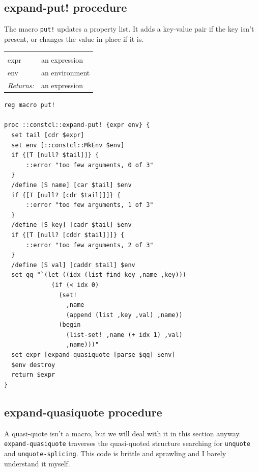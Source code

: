 \documentclass[twoside,9pt]{report}
\begin{document}
\subsection{expand-put! procedure}
\label{expand-put"!-procedure}


The macro \texttt{put!} updates a property list. It adds a key-value pair if the key isn't present, or changes the value in place if it is.

\noindent\begin{tabular}{ |p{1.9cm} p{8cm}| }
\hline
\rowcolor[HTML]{CCCCCC} \multicolumn{2}{|l|}{\bf expand-put! (internal)} \\
expr & an expression \\
env & an environment \\
\textit{Returns:} & an expression \\
\hline
\end{tabular}
\begin{lstlisting}
reg macro put!

proc ::constcl::expand-put! {expr env} {
  set tail [cdr $expr]
  set env [::constcl::MkEnv $env]
  if {[T [null? $tail]]} {
      ::error "too few arguments, 0 of 3"
  }
  /define [S name] [car $tail] $env
  if {[T [null? [cdr $tail]]]} {
      ::error "too few arguments, 1 of 3"
  }
  /define [S key] [cadr $tail] $env
  if {[T [null? [cddr $tail]]]} {
      ::error "too few arguments, 2 of 3"
  }
  /define [S val] [caddr $tail] $env
  set qq "`(let ((idx (list-find-key ,name ,key)))
             (if (< idx 0)
               (set! 
                 ,name
                 (append (list ,key ,val) ,name))
               (begin
                 (list-set! ,name (+ idx 1) ,val)
                 ,name)))"
  set expr [expand-quasiquote [parse $qq] $env]
  $env destroy
  return $expr
}
\end{lstlisting}
\subsection{expand-quasiquote procedure}
\label{expand-quasiquote-procedure}


A quasi-quote isn't a macro, but we will deal with it in this section anyway. \texttt{expand-quasiquote} traverses the quasi-quoted structure searching for \texttt{unquote} and \texttt{unquote-splicing}. This code is brittle and sprawling and I barely understand it myself.
\end{document}
